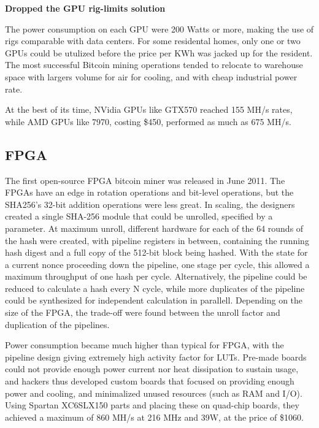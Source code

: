 \textbf{Dropped the GPU rig-limits solution}

The power consumption on each GPU were 200 Watts or more, making the use of rigs comparable with data centers.
For some residental homes, only one or two GPUs could be utulized before the price per KWh was jacked up for the resident.
The most successful Bitcoin mining operations tended to relocate to warehouse space with largers volume for air for cooling, and with cheap industrial power rate.

At the best of its time, NVidia GPUs like GTX570 reached 155 MH/s rates, while AMD GPUs like 7970, costing \$450, performed as much as 675 MH/s.\cite{bespoke-silicon}

\subsection{FPGA}
The first open-source FPGA bitcoin miner was released in June 2011.
The FPGAs have an edge in rotation operations and bit-level operations, but the SHA256's 32-bit addition operations were less great.
In scaling, the designers created a single SHA-256 module that could be unrolled, specified by a parameter.
At maximum unroll, different hardware for each of the 64 rounds of the hash were created, with pipeline registers in between, containing the running hash digest and a full copy of the 512-bit block being hashed.
With the state for a current nonce proceeding down the pipeline, one stage per cycle, this allowed a maximum throughput of one hash per cycle.
Alternatively, the pipeline could be reduced to calculate a hash every N cycle, while more duplicates of the pipeline could be synthesized for independent calculation in parallell.
Depending on the size of the FPGA, the trade-off were found between the unroll factor and duplication of the pipelines.

Power consumption became much higher than typical for FPGA, with the pipeline design giving extremely high activity factor for LUTs.
Pre-made boards could not provide enough power current nor heat dissipation to sustain usage, and hackers thus developed custom boards that focused on providing enough power and cooling, and minimalized unused resources (such as RAM and I/O).
Using Spartan XC6SLX150 parts and placing these on quad-chip boards, they achieved a maximum of 860 MH/s at 216 MHz and 39W, at the price of \$1060.

